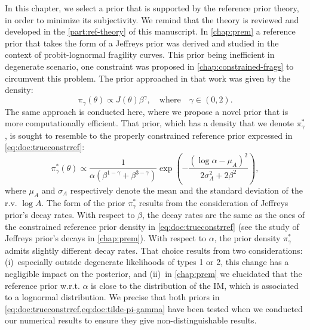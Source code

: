 In this chapter, we select a prior that is supported by the reference prior theory, in order to minimize its subjectivity.
We remind that the theory is reviewed and developed in the \cref{part:ref-theory} of this manuscript. %
In \cref{chap:prem} a reference prior that takes the form of a Jeffreys prior was derived and studied in the context of probit-lognormal fragility curves.
This prior being inefficient in degenerate scenario, one constraint was proposed in \cref{chap:constrained-frags} to circumvent this problem.
The prior approached in that work was given by the density:
    \begin{equation}\label{eq:doe:trueconstrref}
        \pi_\gamma(\theta)\propto J(\theta)\beta^\gamma,\quad\text{where}\quad \gamma\in(0,2).
    \end{equation}
The same approach is conducted here, where we propose a novel prior that is more computationally efficient.
That prior, which has a density that we denote $\pi^\ast_\gamma$, is sought to resemble to the properly constrained reference prior expressed in \cref{eq:doe:trueconstrref}:
    \begin{equation}\label{eq:doe:tilde-pi-gamma}
        \pi^\ast_\gamma(\theta) \propto\frac{1}{\alpha(\beta^{1-\gamma}+\beta^{3-\gamma})}\exp\left(-\frac{(\log\alpha-\mu_A)^2}{2\sigma_A^2+2\beta^2}\right),
    \end{equation}
    where $\mu_A$ and $\sigma_A$ respectively denote the mean and the standard deviation of the r.v. $\log A$.
The form of the prior $\pi^\ast_\gamma$ results from the consideration of Jeffreys prior's decay rates. With respect to $\beta$, the decay rates are the same as the ones of the constrained reference prior density in \cref{eq:doe:trueconstrref} (see the study of Jeffreys prior's decays in \cref{chap:prem}). With respect to $\alpha$, the prior density $\pi^\ast_\gamma$ admits slightly different decay rates. That choice results from two considerations: (i)~especially outside degenerate likelihoods of types 1 or 2, this change has a negligible impact on the posterior, and (ii)~in \cref{chap:prem} we elucidated that the reference prior w.r.t. $\alpha$ is close to the distribution of the IM, which is associated to a lognormal distribution.
We precise that both priors in \cref{eq:doe:trueconstrref,eq:doe:tilde-pi-gamma} have been tested when we conducted our numerical results to ensure they give non-distinguishable results.

